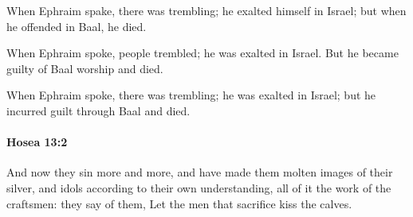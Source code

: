 			\begin{versebox}
					\item[BHS] 
					\item[LXX] 
					\item[ASV] When Ephraim spake, there was trembling; he exalted himself in Israel; but when he offended in Baal, he died.
					\item[NIV] When Ephraim spoke, people trembled; he was exalted in Israel. But he became guilty of Baal worship and died.
					\item[NRSV] When Ephraim spoke, there was trembling; he was exalted in Israel; but he incurred guilt through Baal and died.
			\end{versebox}

		\paragraph{Hosea 13:2} %
			\label{HOSEA-13-2}

			And now they sin more and more, and have made them molten images of their silver, and idols according to their own understanding, all of it the work of the craftsmen: they say of them, Let the men that sacrifice kiss the calves.

